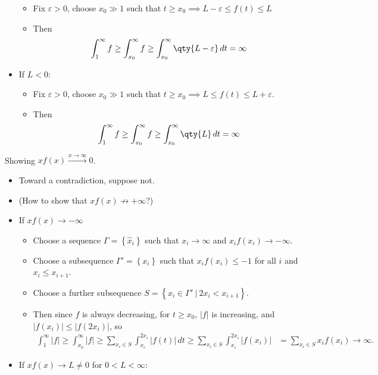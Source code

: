 \begin{solution}
\begin{itemize}
  \begin{itemize}
  \tightlist
  \item
    Fix \(\varepsilon>0\), choose \(x_0\gg 1\) such that
    \(t\geq x_0 \implies L-\varepsilon\leq f(t) \leq L\)
  \item
    Then
    \begin{align*}\int_1^\infty f \geq \int_{x_0}^\infty f \geq \int_{x_0}^\infty \qty{L-\varepsilon}\,dt = \infty\end{align*}
  \end{itemize}
\item
  If \(L<0\):

  \begin{itemize}
  \tightlist
  \item
    Fix \(\varepsilon> 0\), choose \(x_0\gg 1\) such that
    \(t\geq x_0 \implies L \leq f(t) \leq L + \varepsilon\).
  \item
    Then
    \begin{align*}\int_1^\infty f \geq \int_{x_0}^\infty f \geq \int_{x_0}^\infty \qty{L}\,dt = \infty\end{align*}
  \end{itemize}
\end{itemize}

Showing \(xf(x) \overset{x\to \infty}\to 0\).

\begin{itemize}
\tightlist
\item
  Toward a contradiction, suppose not.
\item
  (How to show that \(xf(x) \not\to + \infty\)?)
\item
  If \(xf(x)\to -\infty\)

  \begin{itemize}
  \tightlist
  \item
    Choose a sequence \(\Gamma = \left\{{\widehat{x}_i}\right\}\) such
    that \(x_i \to \infty\) and \(x_i f(x_i) \to -\infty\).
  \item
    Choose a subsequence \(\Gamma' = \left\{{x_i}\right\}\) such that
    \(x_if(x_i) \leq -1\) for all \(i\) and \(x_i \leq x_{i+1}\).
  \item
    Choose a further subsequence
    \(S = \left\{{x_i \in \Gamma' {~\mathrel{\Big|}~}2x_i < x_{i+1}}\right\}\).
  \item
    Then since \(f\) is always decreasing, for \(t\geq x_0\),
    \({\left\lvert {f} \right\rvert}\) is increasing, and
    \({\left\lvert {f(x_i)} \right\rvert} \leq {\left\lvert {f(2x_i)} \right\rvert}\),
    so
    \begin{align*}
    \int_1^{\infty} {\left\lvert {f} \right\rvert} \geq \int_{x_0}^\infty {\left\lvert {f} \right\rvert} \geq \sum_{x_i \in S} \int_{x_i}^{2x_i} {\left\lvert {f(t)} \right\rvert} \, dt \geq 
    \sum_{x_i \in S} \int_{x_i}^{2x_i} {\left\lvert {f(x_i)} \right\rvert} &= \sum_{x_i \in S} x_i f(x_i) \to \infty
    .\end{align*}
  \end{itemize}
\item
  If \(xf(x) \to L \neq 0\) for \(0 < L< \infty\):


\end{itemize}
\end{solution}
